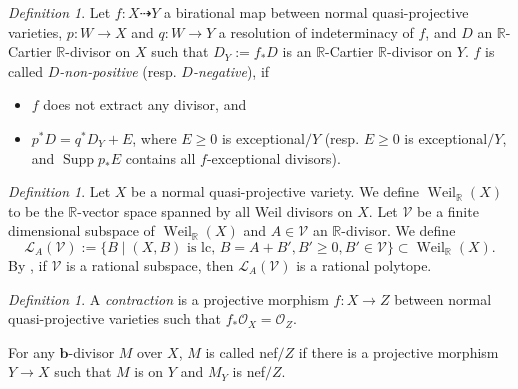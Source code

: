 \documentclass[11pt]{amsart}
\numberwithin{equation}{section}
\newcommand{\bb}{\bm{b}}
\newcommand{\Rr}{\mathbb{R}}
\newcommand{\Weil}{\operatorname{Weil}}
\newcommand{\Supp}{\operatorname{Supp}}
\newcommand{\Oo}{\mathcal{O}}
\theoremstyle{definition}
\theoremstyle{remark}
\newtheorem{defn}[thm]{Definition}
\theoremstyle{definition}
\begin{document}
\begin{defn} Let $f: X\dashrightarrow Y$ a birational map between normal quasi-projective varieties, $p: W\rightarrow X$ and $q: W\rightarrow Y$ a resolution of indeterminacy of $f$, and $D$ an $\Rr$-Cartier $\Rr$-divisor on $X$ such that $D_Y:=f_*D$ is an $\Rr$-Cartier $\Rr$-divisor on $Y$. $f$ is called \emph{$D$-non-positive} (resp. \emph{$D$-negative}), if
\begin{itemize}
    \item $f$ does not extract any divisor, and
    \item $p^*D=q^*D_Y+E$, where $E\geq 0$ is exceptional$/Y$ (resp. $E\geq 0$ is exceptional$/Y$, and $\Supp p_*E$ contains all $f$-exceptional divisors). 
\end{itemize}
\end{defn}

\begin{defn} Let $X$ be a normal quasi-projective variety. We define $\Weil_{\Rr}(X)$ to be the $\Rr$-vector space spanned by all Weil divisors on $X$. Let $\mathcal{V}$ be a finite dimensional subspace of $\Weil_{\Rr}(X)$ and $A\in\mathcal{V}$ an $\mathbb R$-divisor. We define 
$$\mathcal{L}_{A}(\mathcal{V}):=\{B\mid(X,B) \text{ is lc, } B=A+B', B'\geq 0, B'\in \mathcal{V}\}\subset\Weil_{\Rr}(X).$$
By \cite[Lemma 3.7.2]{BCHM10}, if $\mathcal{V}$ is a rational subspace, then $\mathcal{L}_{A}(\mathcal{V})$ is a rational polytope.
\end{defn}



\begin{defn}
A \emph{contraction} is a projective morphism $f:X\to Z$ between normal quasi-projective varieties such that $f_{*}\Oo_X=\Oo_Z$. 

For any $\bb$-divisor $M$ over $X$, $M$ is called nef$/Z$ if there is a projective morphism $Y\rightarrow X$ such that $M$ is on $Y$ and $M_Y$ is nef$/Z$.
\end{defn}
\end{document}
